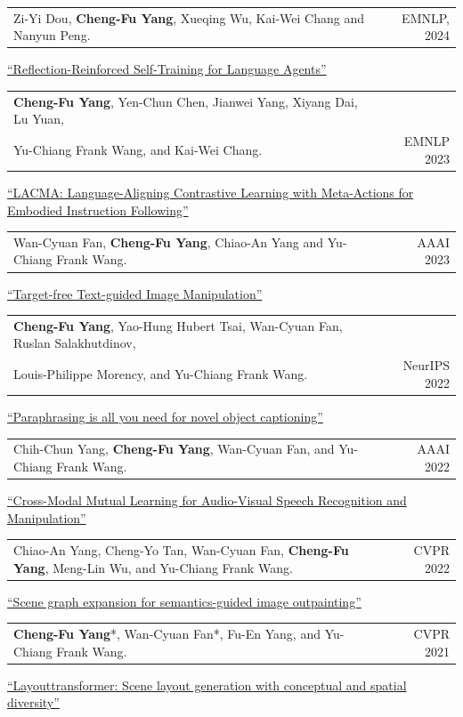 \documentclass[letterpaper,11pt]{article}
\makeatletter
\newcommand{\resumePublicationHeading}[3]{
    \item
    \begin{tabular*}{0.97\textwidth}{l@{\extracolsep{\fill}}r}
      \small #1 & \small #2 \\
    \end{tabular*}\vspace{-7pt}

    \vspace{3pt}
    \small \hspace*{0.05in} #3
    \vspace{-4pt}
}
\makeatother
\begin{document}
      \resumePublicationHeading{Zi-Yi Dou, \textbf{Cheng-Fu Yang}, Xueqing Wu, Kai-Wei Chang and Nanyun Peng.}{EMNLP, 2024}{\href{https://aclanthology.org/2024.emnlp-main.861/}{``Reflection-Reinforced Self-Training for Language Agents''}}

      \resumePublicationHeading{\textbf{Cheng-Fu Yang}, Yen-Chun Chen, Jianwei Yang, Xiyang Dai, Lu Yuan, \\
      \hspace*{0.05in} Yu-Chiang Frank Wang, and Kai-Wei Chang.}{EMNLP 2023}{\href{https://aclanthology.org/2023.emnlp-main.77/}{``LACMA: Language-Aligning Contrastive Learning with Meta-Actions for Embodied Instruction Following''}}

      \resumePublicationHeading{Wan-Cyuan Fan, \textbf{Cheng-Fu Yang}, Chiao-An Yang and Yu-Chiang Frank Wang.}{AAAI 2023}{\href{https://ojs.aaai.org/index.php/AAAI/article/view/25134}{``Target-free Text-guided Image Manipulation''}}

      \resumePublicationHeading{\textbf{Cheng-Fu Yang}, Yao-Hung Hubert Tsai, Wan-Cyuan Fan, Ruslan Salakhutdinov, \\
      \hspace*{0.05in} Louis-Philippe Morency, and Yu-Chiang Frank Wang.}{NeurIPS 2022}{\href{https://proceedings.neurips.cc/paper_files/paper/2022/hash/2a8e6c09a1fd747e43a74710c79efdd5-Abstract-Conference.html}{``Paraphrasing is all you need for novel object captioning''}}

      \resumePublicationHeading{Chih-Chun Yang, \textbf{Cheng-Fu Yang}, Wan-Cyuan Fan, and Yu-Chiang Frank Wang. }{AAAI 2022}{\href{https://ojs.aaai.org/index.php/AAAI/article/view/20210}{``Cross-Modal Mutual Learning for Audio-Visual Speech Recognition and Manipulation''}}

      \resumePublicationHeading{Chiao-An Yang, Cheng-Yo Tan, Wan-Cyuan Fan, \textbf{Cheng-Fu Yang}, Meng-Lin Wu, and Yu-Chiang Frank Wang.}{CVPR 2022}{\href{https://openaccess.thecvf.com/content/CVPR2022/papers/Yang_Scene_Graph_Expansion_for_Semantics-Guided_Image_Outpainting_CVPR_2022_paper.pdf}{``Scene graph expansion for semantics-guided image outpainting''}}

      \resumePublicationHeading{\textbf{Cheng-Fu Yang}*, Wan-Cyuan Fan*, Fu-En Yang, and Yu-Chiang Frank Wang.}{CVPR 2021}{\href{https://openaccess.thecvf.com/content/CVPR2021/html/Yang_LayoutTransformer_Scene_Layout_Generation_With_Conceptual_and_Spatial_Diversity_CVPR_2021_paper.html}{``Layouttransformer: Scene layout generation with conceptual and spatial diversity''}}
\end{document}
